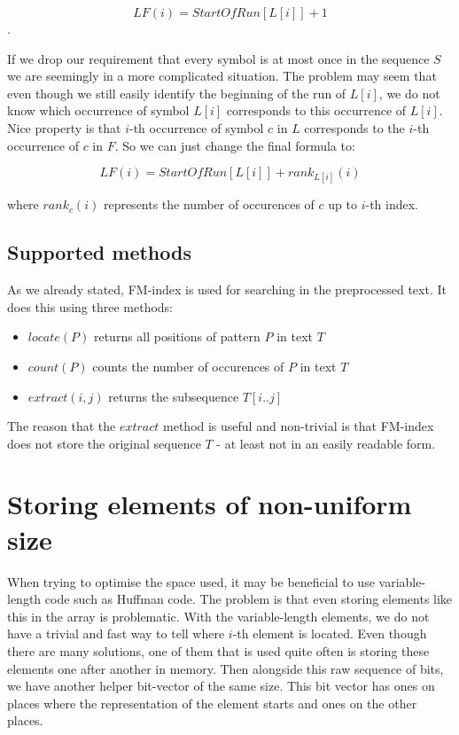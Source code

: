 $$LF(i) = StartOfRun[L[i]] + 1$$.

If we drop our requirement that every symbol is at most once in the sequence $S$
we are seemingly in a more complicated situation. The problem may seem that even
though we still easily identify the beginning of the run of $L[i]$, we do not
know which occurrence of symbol $L[i]$ corresponds to this occurrence of $L[i]$.
Nice property is that $i$-th occurrence of symbol $c$ in $L$ corresponds to the
$i$-th occurrence of $c$ in $F$. So we can just change the final formula to:

				$$LF(i) = StartOfRun[L[i]] + rank_{L[i]}(i)$$

where $rank_c(i)$ represents the number of occurences of $c$ up to $i$-th index.

\subsection{Supported methods}

As we already stated, FM-index is used for searching in the preprocessed text.
It does this using three methods:

\begin{itemize}
\item $locate(P)$ returns all positions of pattern $P$ in text $T$
\item $count(P)$ counts the number of occurences of $P$ in text $T$
\item $extract(i, j)$ returns the subsequence $T[i..j]$
\end{itemize}

The reason that the $extract$ method is useful and non-trivial is that FM-index
does not store the original sequence $T$ - at least not in an easily readable form.


\section{Storing elements of non-uniform size}

When trying to optimise the space used, it may be beneficial to use variable-length
code such as Huffman code. The problem is that even storing elements like this in
the array is problematic. With the variable-length elements, we do not have a trivial
and fast way to tell where $i$-th element is located. Even though there are many
solutions, one of them that is used quite often is storing these elements one after
another in memory. Then alongside this raw sequence of bits, we have another helper
bit-vector of the same size. This bit vector has ones on places where the representation
of the element starts and ones on the other places.


